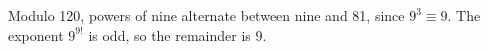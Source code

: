 Modulo 120, powers of nine alternate between nine and 81, since $9^3\equiv9$. The exponent $9^{9!}$ is odd, so the remainder is $\boxed9$.
